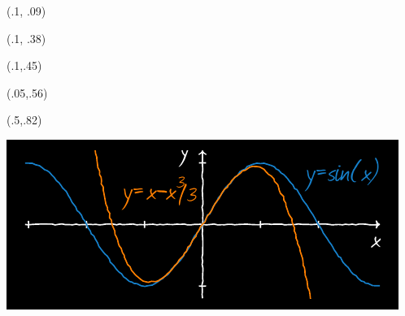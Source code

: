 \begin{textblock}{1}(.1, .09)
\end{textblock}

\begin{textblock}{1}(.1, .38)
    \noindent {\fontsize{24.88}{2}\selectfont
    \bfseries\textcolor{white}{对所学所思做一些持久化、去碎片化处理}}
\end{textblock}


\begin{textblock}{1}(.1,.45)
    \noindent {\fontsize{22.74}{2}\selectfont
        \bfseries\textcolor{white}{吴继鹏 著}}
\end{textblock}



\begin{textblock}{.9}(.05,.56)
    \begin{flushright}
        \noindent {\fontsize{20.74}{2}\selectfont
            \bfseries\textcolor{orange}{version 1.1}}
    \end{flushright}
\end{textblock}



\begin{textblock}{.45}(.5,.82)
    \begin{center}
        \includegraphics[width=.45\paperwidth]{dlsin}
    \end{center}
\end{textblock}

